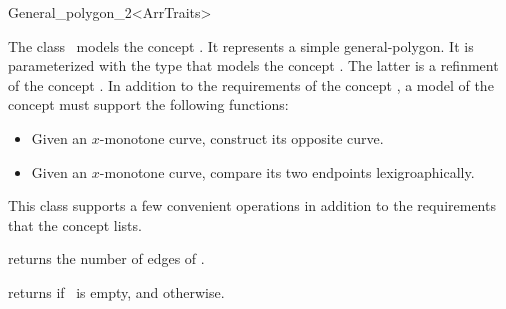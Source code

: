 \ccRefPageBegin

\begin{ccRefClass}{General_polygon_2<ArrTraits>}

\ccThreeToTwo

\ccDefinition
The class \ccRefName\ models the concept .
It represents a simple general-polygon. It is parameterized with the type
 that models the concept
. The latter is a refinment
of the concept . In addition to the
requirements of the concept , a
model of the concept  must
support the following functions:
\begin{itemize}
\item Given an $x$-monotone curve, construct its opposite curve.
\item Given an $x$-monotone curve, compare its two endpoints lexigroaphically.
\end{itemize} 

This class supports a few convenient operations in addition to the 
requirements that the concept  lists.

 
\ccTypes



\ccCreation
{}

% 
% 

\ccOperations
 {returns the number of edges of \ccVar.}

\ccModifiers


\ccPredicates
{returns  if \ccVar\ is empty, and  otherwise.}



\ccIsModel

\end{ccRefClass}
\ccRefPageEnd
